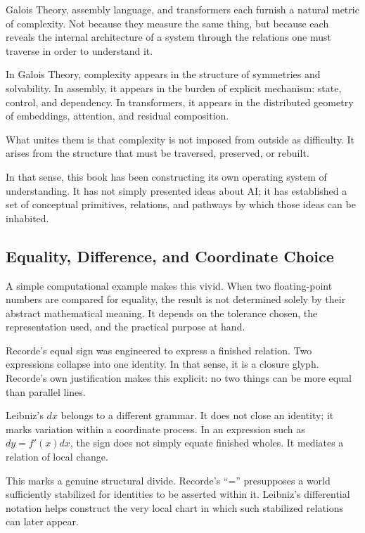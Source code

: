 Galois Theory, assembly language, and transformers each furnish a
natural metric of complexity. Not because they measure the same thing,
but because each reveals the internal architecture of a system through
the relations one must traverse in order to understand it.

In Galois Theory, complexity appears in the structure of symmetries and
solvability. In assembly, it appears in the burden of explicit
mechanism: state, control, and dependency. In transformers, it appears
in the distributed geometry of embeddings, attention, and residual
composition.

What unites them is that complexity is not imposed from outside as
difficulty. It arises from the structure that must be traversed,
preserved, or rebuilt.

In that sense, this book has been constructing its own operating system
of understanding. It has not simply presented ideas about AI; it has
established a set of conceptual primitives, relations, and pathways by
which those ideas can be inhabited.

\hypertarget{equality-difference-and-coordinate-choice}{%
\subsection{Equality, Difference, and Coordinate
Choice}\label{equality-difference-and-coordinate-choice}}

A simple computational example makes this vivid. When two floating-point
numbers are compared for equality, the result is not determined solely
by their abstract mathematical meaning. It depends on the tolerance
chosen, the representation used, and the practical purpose at hand.

Recorde's equal sign was engineered to express a finished relation. Two
expressions collapse into one identity. In that sense, it is a closure
glyph. Recorde's own justification makes this explicit: no two things
can be more equal than parallel lines.

Leibniz's \(dx\) belongs to a different grammar. It does not close an
identity; it marks variation within a coordinate process. In an
expression such as \(dy = f'(x) dx\), the sign does not simply equate
finished wholes. It mediates a relation of local change.

This marks a genuine structural divide. Recorde's ``='' presupposes a
world sufficiently stabilized for identities to be asserted within it.
Leibniz's differential notation helps construct the very local chart in
which such stabilized relations can later appear.

